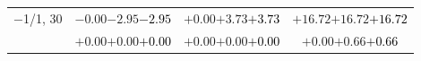\documentclass[compress]{beamer}
\begin{document}
\begin{frame}
\begin{tabular}{r | c | c | c}
$-$1/1, 30 & $-0.00$\hspace{0.1 cm}$-2.95$\hspace{0.1 cm}\textcolor{black}{$-2.95$} & $+0.00$\hspace{0.1 cm}$+3.73$\hspace{0.1 cm}\textcolor{black}{$+3.73$} & $+16.72$\hspace{0.1 cm}$+16.72$\hspace{0.1 cm}\textcolor{black}{$+16.72$} \\
           & $+0.00$\hspace{0.1 cm}$+0.00$\hspace{0.1 cm}\textcolor{black}{$+0.00$} & $+0.00$\hspace{0.1 cm}$+0.00$\hspace{0.1 cm}\textcolor{black}{$+0.00$} & $+0.00$\hspace{0.1 cm}$+0.66$\hspace{0.1 cm}\textcolor{black}{$+0.66$} \\
\end{tabular}
\end{frame}
\end{document}

